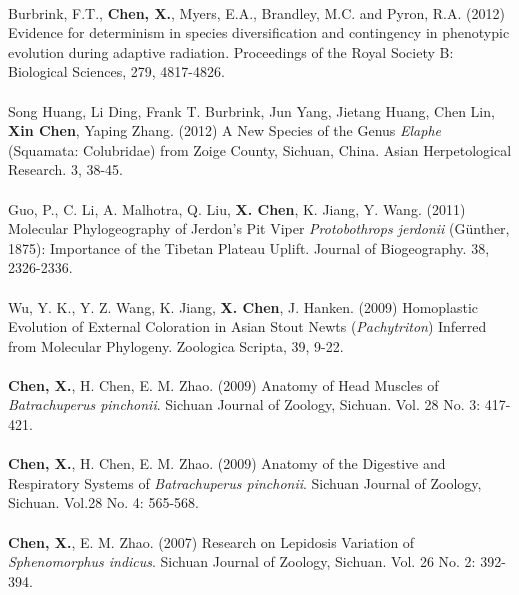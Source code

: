 \documentclass[12pt]{article}
\begin{document}
\\[-0.30\baselineskip]%
Burbrink, F.T., \textbf{Chen, X.}, Myers, E.A., Brandley, M.C. and Pyron, R.A. (2012) Evidence for determinism in species diversification and contingency in phenotypic evolution during adaptive radiation. Proceedings of the Royal Society B: Biological Sciences, 279, 4817-4826.\\
\\[-0.30\baselineskip]%
Song Huang, Li Ding, Frank T. Burbrink, Jun Yang, Jietang Huang, Chen Lin, \textbf{Xin Chen}, Yaping Zhang. (2012) A New Species of the Genus \textit{Elaphe} (Squamata: Colubridae) from Zoige County, Sichuan, China. Asian Herpetological Research. 3, 38-45.\\
\\[-0.30\baselineskip]%
Guo, P., C. Li, A. Malhotra, Q. Liu, \textbf{X. Chen}, K. Jiang, Y. Wang. (2011) Molecular Phylogeography of Jerdon's Pit Viper \textit{Protobothrops jerdonii} (G\"unther, 1875): Importance of the Tibetan Plateau Uplift. Journal of Biogeography. 38, 2326-2336.\\
\\[-0.30\baselineskip]%
Wu, Y. K., Y. Z. Wang, K. Jiang, \textbf{X. Chen}, J. Hanken. (2009) Homoplastic Evolution of External Coloration in Asian Stout Newts (\textit{Pachytriton}) Inferred from Molecular Phylogeny. Zoologica Scripta, 39, 9-22.\\
\\[-0.30\baselineskip]%
\textbf{Chen, X.}, H. Chen, E. M. Zhao. (2009) Anatomy of Head Muscles of \textit{Batrachuperus pinchonii}. Sichuan Journal of Zoology, Sichuan. Vol. 28 No. 3: 417-421.\\
\\[-0.30\baselineskip]%
\textbf{Chen, X.}, H. Chen, E. M. Zhao. (2009) Anatomy of the Digestive and Respiratory Systems of \textit{Batrachuperus pinchonii}. Sichuan Journal of Zoology, Sichuan. Vol.28 No. 4: 565-568.\\
\\[-0.30\baselineskip]%
\textbf{Chen, X.}, E. M. Zhao. (2007) Research on Lepidosis Variation of \textit{Sphenomorphus indicus}. Sichuan Journal of Zoology, Sichuan. Vol. 26 No. 2: 392-394.\\
\\[-0.30\baselineskip]%
\end{document}
